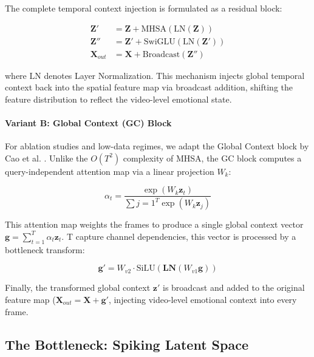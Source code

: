 \documentclass[conference]{IEEEtran}
\begin{document}
The complete temporal context injection is formulated as a residual block:

\begin{align}
    \mathbf{Z}' &= \mathbf{Z} + \text{MHSA}(\text{LN}(\mathbf{Z})) \\
    \mathbf{Z}'' &= \mathbf{Z}' + \text{SwiGLU}(\text{LN}(\mathbf{Z}')) \\
    \mathbf{X}_{out} &= \mathbf{X} + \text{Broadcast}(\mathbf{Z}'')
\end{align}

where $\text{LN}$ denotes Layer Normalization. This mechanism injects global temporal context back into the spatial feature map via broadcast addition, shifting the feature distribution to reflect the video-level emotional state.

\paragraph{Variant B: Global Context (GC) Block}
For ablation studies and low-data regimes, we adapt the Global Context block by Cao et al. \cite{Cao2019}. Unlike the $O(T^2)$ complexity of MHSA, the GC block computes a query-independent attention map via a linear projection $W_{k}$:

\begin{equation}
    \alpha_t = \frac{\exp(W_k \mathbf{z}_t)}{\sum{j=1}^{T} \exp(W_k \mathbf{z}_j)}
\end{equation}

This attention map weights the frames to produce a single global context vector $\mathbf{g} = \sum_{t=1}^{T} \alpha_t \mathbf{z}_t$. T capture channel dependencies, this vector is processed by a bottleneck transform:

\begin{equation}
    \mathbf{g}' = W_{v2} \cdot \text{SiLU}(\textbf{LN}(W_{v1} \mathbf{g}))
\end{equation}

Finally, the transformed global context $\mathbf{z}'$ is broadcast and added to the original feature map ($\mathbf{X}_{out} = \mathbf{X} + \mathbf{g}'$, injecting video-level emotional context into every frame.



\subsection{The Bottleneck: Spiking Latent Space} %
\end{document}
